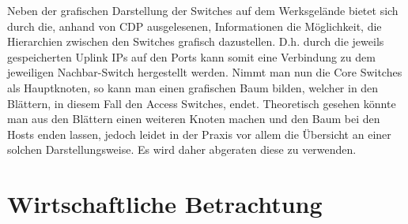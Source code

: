Neben der grafischen Darstellung der Switches auf dem Werksgelände bietet sich durch die, anhand von CDP ausgelesenen, Informationen die Möglichkeit, die Hierarchien zwischen den Switches grafisch dazustellen. D.h. durch die jeweils gespeicherten Uplink IPs auf den Ports kann somit eine Verbindung zu dem jeweiligen Nachbar-Switch hergestellt werden.
Nimmt man nun die Core Switches als Hauptknoten, so kann man einen grafischen Baum bilden, welcher in den Blättern, in diesem Fall den Access Switches, endet.
Theoretisch gesehen könnte man aus den Blättern einen weiteren Knoten machen und den Baum bei den Hosts enden lassen, jedoch leidet in der Praxis vor allem die Übersicht an einer solchen Darstellungsweise. Es wird daher abgeraten diese zu verwenden.

\section{Wirtschaftliche Betrachtung}
\label{sec:economicloverview}

